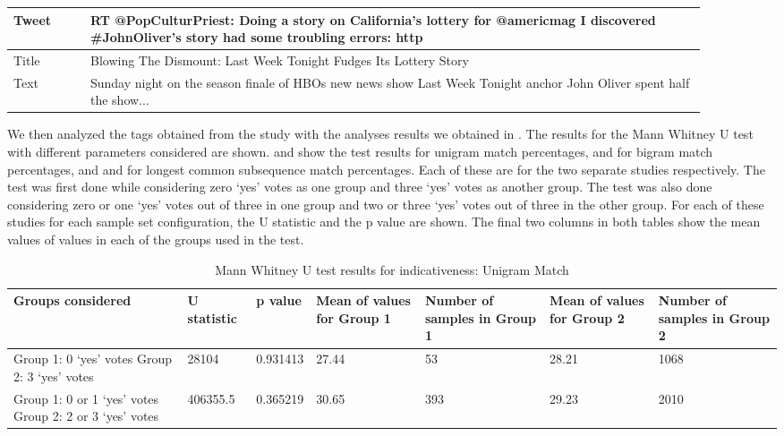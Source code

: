 \begin{table}[!htbp]
\centering
\begin{tabular}{|p{0.1\linewidth}|p{0.8\linewidth}|}
\hline
Tweet & RT @PopCulturPriest: Doing a story on California's lottery for @americmag I discovered \#JohnOliver's story had some troubling errors: http \\ \hline
Title & Blowing The Dismount: Last Week Tonight Fudges Its Lottery Story \\ \hline
Text  & Sunday night on the season finale of HBOs new news show Last Week Tonight anchor John Oliver spent half the show... \\ \hline
\end{tabular}
\label{tab:exq2yes}
\end{table}

We then analyzed the tags obtained from the study with the analyses results we obtained in . The results for the Mann Whitney U test \citep{mann1947test,wilcoxon1947probability} with different parameters considered are shown.  and  show the test results for unigram match percentages,  and  for bigram match percentages, and  and  for longest common subsequence match percentages. Each of these are for the two separate studies respectively.  The test was first done while considering zero `yes' votes as one group and three `yes' votes as another group. The test was also done considering zero or  one `yes' votes out of three in one group and two or three `yes' votes out of three in the other group. For each of these studies for each sample set configuration, the U statistic and the p value are shown. The final two columns in both tables show the mean values of values in each of the groups used in the test. 

\begin{table}[!htbp]
\caption{Mann Whitney U test results for indicativeness: Unigram Match}
\centering
\label{tab:unicorr1}
\begin{tabular}{|p{}|p{}|p{}|p{}|p{}|p{}|p{}|}
\hline
Groups considered    & U statistic & p value & Mean of values for Group 1 & Number of samples in Group 1 & Mean of values for Group 2 & Number of samples in Group 2\\ \hline
Group 1: 0 `yes' votes \newline Group 2: 3 `yes' votes &  28104  &  0.931413  &  27.44  & 53 & 28.21 &   1068  \\ \hline
Group 1: 0 or 1 `yes' votes \newline Group 2: 2 or 3 `yes' votes &   406355.5  & 0.365219 & 30.65  & 393 & 29.23 & 2010 \\ \hline
\end{tabular}
\end{table}

